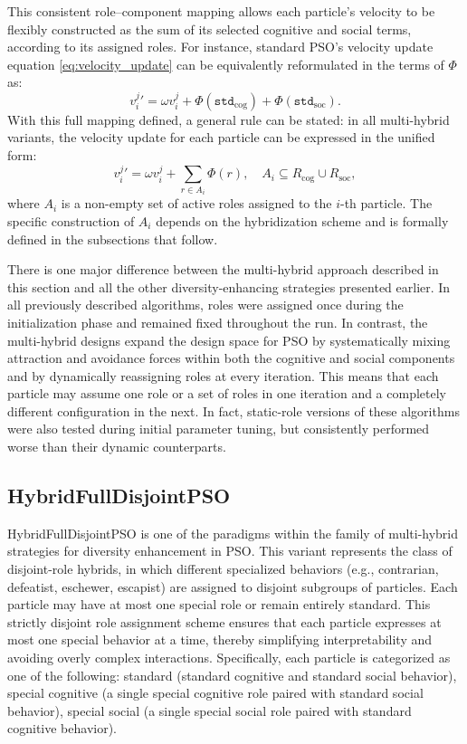 {This consistent role--component mapping allows each particle’s velocity to be flexibly constructed as the sum of its selected cognitive and social terms, according to its assigned roles. For instance, standard PSO's velocity update equation \eqref{eq:velocity_update} can be equivalently reformulated in the terms of $\Phi$ as:
\begin{equation}\label{eq:velocity_update_reformulated}
    v_{i}^{j}{}' = \omega v_{i}^{j} + \Phi(\texttt{std}_\text{cog}) +  \Phi(\texttt{std}_\text{soc}).
\end{equation}
With this full mapping defined, a general rule can be stated: in all multi-hybrid variants, the velocity update for each particle can be expressed in the unified form:
\begin{equation}\label{eq:velocity_update_universal}
    v_{i}^{j}{}' = \omega v_{i}^{j} + \sum_{r \in A_i} \Phi(r),
\quad 
A_i \subseteq R_\text{cog} \cup R_\text{soc},
\end{equation}
where $A_i$ is a non-empty set of active roles assigned to the $i$-th particle.
The specific construction of $A_i$ depends on the hybridization scheme and is formally defined in the subsections that follow.


There is one major difference between the multi-hybrid approach described in this section and all the other diversity-enhancing strategies presented earlier. In all previously described algorithms, roles were assigned once during the initialization phase and remained fixed throughout the run. In contrast, the multi-hybrid designs expand the design space for PSO by systematically mixing attraction and avoidance forces within both the cognitive and social components and by dynamically reassigning roles at every iteration. This means that each particle may assume one role or a set of roles in one iteration and a completely different configuration in the next. In fact, static-role versions of these algorithms were also tested during initial parameter tuning, but consistently performed worse than their dynamic counterparts.




\subsection{HybridFullDisjointPSO}


HybridFullDisjointPSO is one of the paradigms within the family of multi-hybrid strategies for diversity enhancement in PSO.
This variant represents the class of disjoint-role hybrids, in which different specialized behaviors (e.g., contrarian, defeatist, eschewer, escapist) are assigned to disjoint subgroups of particles. Each particle may have at most one special role or remain entirely standard. This strictly disjoint role assignment scheme ensures that each particle expresses at most one special behavior at a time, thereby simplifying interpretability and avoiding overly complex interactions. Specifically, each particle is categorized as one of the following: standard (standard cognitive and standard social behavior),  special cognitive (a single special cognitive role paired with standard social behavior), special social (a single special social role paired with standard cognitive behavior).


}
